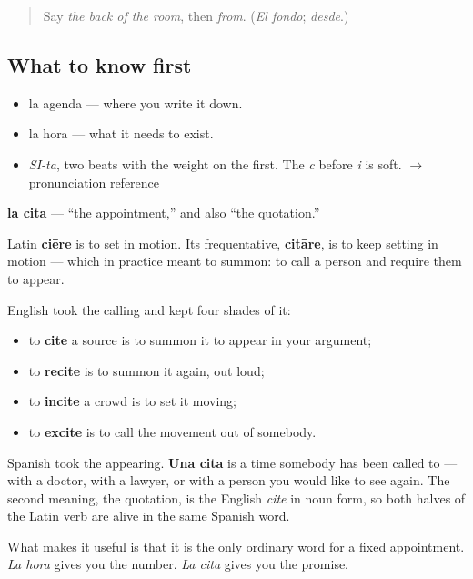 \label{lesson:ES-C356-cita}



\begin{quote}
Say \emph{the back of the room}, then \emph{from}. (\emph{El fondo}; \emph{desde}.)
\end{quote}

\subsection*{What to know first}
\begin{itemize}
\raggedright
  \item la agenda — where you write it down.
  \item la hora — what it needs to exist.
\end{itemize}

\begin{sounds}
\begin{itemize}
\raggedright
  \item \emph{SI-ta}, two beats with the weight on the first. The \emph{c} before \emph{i} is soft. $\to$ pronunciation reference
\end{itemize}
\end{sounds}

\begin{cousinweb}
\textbf{la cita} — \textquotedblleft{}the appointment,\textquotedblright{} and also \textquotedblleft{}the quotation.\textquotedblright{}

Latin \textbf{ciēre} is to set in motion. Its frequentative, \textbf{citāre}, is to keep setting in motion — which in practice meant to summon: to call a person and require them to appear.

English took the calling and kept four shades of it:

\begin{itemize}
\raggedright
  \item to \textbf{cite} a source is to summon it to appear in your argument;
  \item to \textbf{recite} is to summon it again, out loud;
  \item to \textbf{incite} a crowd is to set it moving;
  \item to \textbf{excite} is to call the movement out of somebody.
\end{itemize}

Spanish took the appearing. \textbf{Una cita} is a time somebody has been called to — with a doctor, with a lawyer, or with a person you would like to see again. The second meaning, the quotation, is the English \emph{cite} in noun form, so both halves of the Latin verb are alive in the same Spanish word.

What makes it useful is that it is the only ordinary word for a fixed appointment. \emph{La hora} gives you the number. \emph{La cita} gives you the promise.
\end{cousinweb}

